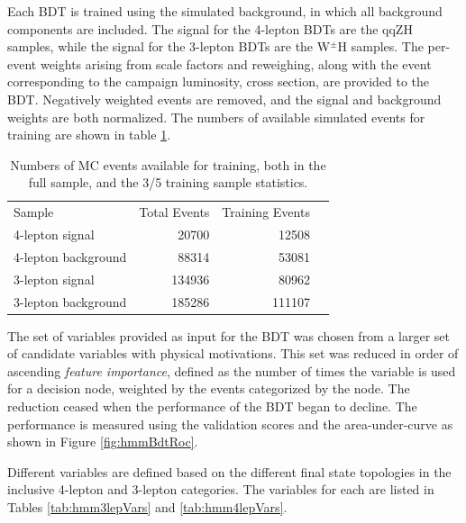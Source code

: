 Each BDT is trained using the simulated background, in which all background components are included.
The signal for the 4-lepton BDTs are the qqZH samples, while the signal for the 3-lepton BDTs are the W$^\pm$H samples.
The per-event weights arising from scale factors and reweighing, along with the event corresponding to the campaign luminosity, cross section, are provided to the BDT.
Negatively weighted events are removed, and the signal and background weights are both normalized.
The numbers of available simulated events for training are shown in table \ref{tab:hmmSampleStatistics}.

\begin{table}[htbp]
 \begin{center}
\begin{tabular}{l r r r}\toprule
Sample               & Total Events & Training Events \\
4-lepton signal      & 20700        & 12508    \\
4-lepton background  & 88314        & 53081    \\
3-lepton signal      & 134936       & 80962    \\
3-lepton background  & 185286       & 111107   \\
\bottomrule\end{tabular} 
 \end{center}
 \caption{Numbers of MC events available for training, both in the full sample, and the 3/5 training sample statistics.}
\label{tab:hmmSampleStatistics}
\end{table}

The set of variables provided as input for the BDT was chosen from a larger set of candidate variables with physical motivations.
This set was reduced in order of ascending \emph{feature importance}, defined as the number of times the variable is used for a decision node, weighted by the events categorized by the node.
The reduction ceased when the performance of the BDT began to decline.
The performance is measured using the validation scores and the area-under-curve as shown in Figure \ref{fig:hmmBdtRoc}.

Different variables are defined based on the different final state topologies in the inclusive 4-lepton and 3-lepton categories.
The variables for each are listed in Tables \ref{tab:hmm3lepVars} and \ref{tab:hmm4lepVars}.

